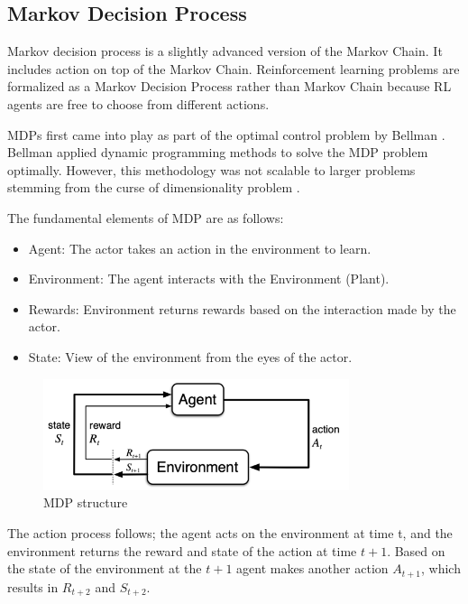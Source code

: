 \subsection{Markov Decision Process}\label{section:markov}

Markov decision process is a slightly advanced version of the Markov Chain. It includes action on top of the Markov Chain. Reinforcement learning problems are formalized as a Markov Decision Process rather than Markov Chain because RL agents are free to choose from different actions.

MDPs first came into play as part of the optimal control problem by Bellman \cite{Bellman1958}. Bellman applied dynamic programming methods to solve the MDP problem optimally. However, this methodology was not scalable to larger problems stemming from the curse of dimensionality problem \cite{Sutton2018}.

The fundamental elements of MDP are as follows:
\begin{itemize}
    \item Agent:  The actor takes an action in the environment to learn.
    \item Environment: The agent interacts with the Environment (Plant).
    \item Rewards: Environment returns rewards based on the interaction made by the actor.
    \item State: View of the environment from the eyes of the actor. 
\end{itemize}

\begin{figure}[htbp]
    \centering
    \includegraphics[width=0.8\textwidth]{figures/mdp}
    \caption{MDP structure}
    \label{fig: mdp}
\end{figure}

The action process follows; the agent acts on the environment at time t, and the environment returns the reward and state of the action at time \(t+1\). Based on the state of the environment at the \(t+1\) agent makes another action \(A_{t+1}\), which results in \(R_{t+2}\) and \(S_{t+2}\).

